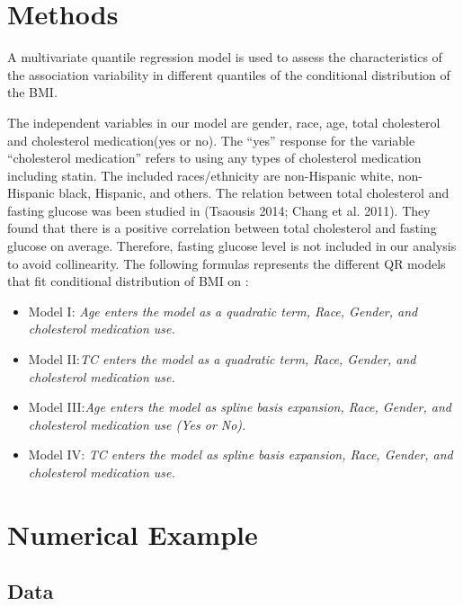 \documentclass[
  12pt,
]{article}
\begin{document}
\section{Methods}

A multivariate quantile regression model is used to assess the characteristics of the association variability in different quantiles of the conditional distribution of the BMI.

The independent variables in our model are gender, race, age, total cholesterol and cholesterol medication(yes or no). The ``yes'' response for the variable ``cholesterol medication'' refers to using any types of cholesterol medication including statin. The included races/ethnicity are non-Hispanic white, non-Hispanic black, Hispanic, and others. The relation between total cholesterol and fasting glucose was been studied in (Tsaousis 2014; Chang et al. 2011). They found that there is a positive correlation between total cholesterol and fasting glucose on average. Therefore, fasting glucose level is not included in our analysis to avoid collinearity. The following formulas represents the different QR models that fit conditional distribution of BMI on :

\begin{itemize}
 \item Model I: \textit{Age enters the model as a quadratic term, Race, Gender, and cholesterol medication use.}
 \item Model II:\textit{TC enters the model as a quadratic term, Race, Gender, and cholesterol medication use.}
 \item Model III:\textit{Age enters the model as spline basis expansion, Race, Gender, and cholesterol medication use (Yes or No).}
 \item Model IV: \textit{TC enters the model as spline basis expansion, Race, Gender, and cholesterol medication use.}
 \end{itemize}

\section{Numerical Example}
\subsection{Data}
\end{document}
